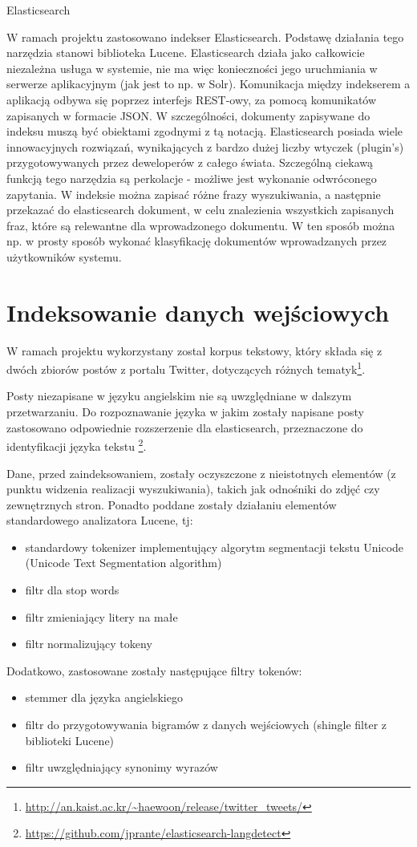 \documentclass[runningheads]{llncs}
\begin{document}
Elasticsearch

W ramach projektu zastosowano indekser Elasticsearch. Podstawę działania tego
narzędzia stanowi biblioteka Lucene. Elasticsearch działa jako całkowicie 
niezależna usługa w systemie, nie ma więc konieczności jego  uruchmiania w
serwerze aplikacyjnym  (jak jest to np. w Solr). Komunikacja  między indekserem
a aplikacją odbywa się poprzez interfejs REST-owy, za pomocą  komunikatów
zapisanych w formacie JSON. W szczególności, dokumenty zapisywane  do indeksu
muszą być obiektami zgodnymi z tą notacją.
Elasticsearch posiada wiele innowacyjnych rozwiązań,  wynikających z bardzo
dużej liczby wtyczek (plugin’s) przygotowywanych przez  deweloperów z całego
świata. Szczególną ciekawą funkcją tego narzędzia są perkolacje  -  możliwe jest
wykonanie odwróconego zapytania. W indeksie można zapisać różne  frazy
wyszukiwania, a następnie przekazać do elasticsearch dokument, w  celu
znalezienia wszystkich zapisanych fraz, które  są relewantne dla wprowadzonego
dokumentu. W ten sposób można np. w prosty sposób wykonać  klasyfikację
dokumentów wprowadzanych przez użytkowników systemu.

\section{Indeksowanie danych wejściowych}
\label{sec:indeksowanie-danych-wejsciowych}
W ramach projektu wykorzystany został korpus tekstowy, który składa się z dwóch
zbiorów postów z portalu Twitter, dotyczących różnych tematyk\footnote{
\url{http://an.kaist.ac.kr/~haewoon/release/twitter_tweets/}}.

Posty niezapisane w języku angielskim nie są uwzględniane w dalszym
przetwarzaniu. 
Do rozpoznawanie  języka w jakim zostały napisane posty zastosowano
odpowiednie rozszerzenie dla elasticsearch,  przeznaczone do identyfikacji
języka tekstu
\footnote{\url{https://github.com/jprante/elasticsearch-langdetect}}.

Dane, przed zaindeksowaniem, zostały oczyszczone z nieistotnych elementów (z
punktu widzenia realizacji wyszukiwania), takich jak odnośniki do  zdjęć czy
zewnętrznych stron. Ponadto poddane zostały działaniu elementów standardowego
analizatora Lucene, tj:
\begin{itemize}
  \item standardowy tokenizer implementujący algorytm segmentacji tekstu Unicode
  (Unicode Text Segmentation algorithm)
  \item filtr dla stop words
  \item filtr zmieniający litery na małe
  \item filtr normalizujący tokeny
\end{itemize}
Dodatkowo, zastosowane zostały następujące filtry tokenów:
\begin{itemize}
  \item stemmer dla języka angielskiego
  \item filtr do przygotowywania bigramów z danych wejściowych (shingle filter z
  biblioteki Lucene)
  \item filtr uwzględniający synonimy wyrazów
\end{itemize}
\end{document}
